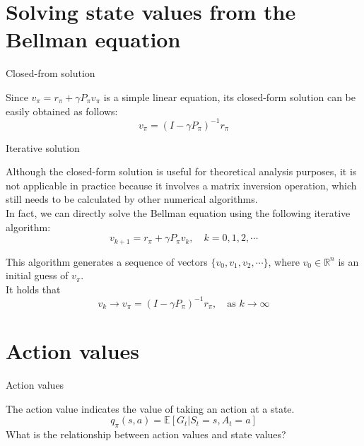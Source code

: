 \documentclass[aspectratio=169,xcolor=dvipsnames]{beamer}
\begin{document}
\section{Solving state values from the Bellman equation}

\begin{frame}{Closed-from solution}

Since $v_\pi = r_\pi + \gamma P_\pi v_\pi$ is a simple linear equation, its closed-form solution can be easily obtained as follows:
\begin{equation*}
	v_\pi = (I - \gamma P_\pi)^{-1} r_\pi
\end{equation*}

\end{frame}

\begin{frame}{Iterative solution}

Although the closed-form solution is useful for theoretical analysis purposes, it is not applicable in practice because it involves a matrix inversion operation, which still needs to be calculated by other numerical algorithms. \\
In fact, we can directly solve the Bellman equation using the following iterative algorithm:
\begin{equation*}
	v_{k + 1} = r_\pi + \gamma P_\pi v_k, \quad k = 0, 1, 2, \cdots
\end{equation*}

This algorithm generates a sequence of vectors $\{ v_0, v_1, v_2, \cdots \}$, where $v_0 \in \mathbb{R}^n$ is an initial guess of $v_\pi$. \\
It holds that
\begin{equation*}
	v_k \rightarrow v_\pi = (I - \gamma P_\pi)^{-1} r_\pi, \quad \text{as } k \rightarrow \infty
\end{equation*}

\end{frame}

\section{Action values}

\begin{frame}{Action values}

The action value indicates the value of taking an action at a state.
\begin{equation*}
	q_\pi(s, a) = \mathbb{E}[G_t | S_t = s, A_t = a]
\end{equation*}
What is the relationship between action values and state values?

\end{frame}
\end{document}
